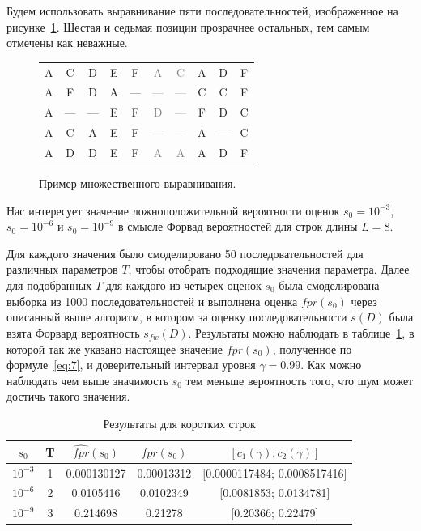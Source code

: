 \documentclass[specialist,
substylefile = spbu_report.rtx,
subf,href,colorlinks=true, 12pt]{disser}
\begin{document}
			Будем использовать выравнивание пяти последовательностей, изображенное на рисунке~\ref{fg:4}. Шестая и седьмая позиции прозрачнее остальных, тем самым отмечены как неважные.		
			\begin{figure}[h]
				\centering
				\begin{tabular}{cccccccccc}
					A&C&D&E&F&\textcolor{gray}{A}&\textcolor{gray}{C}&A&D&F\\
					A&F&D&A&—&\textcolor{gray}{—}&\textcolor{gray}{—}&C&C&F\\
					A&—&—&E&F&\textcolor{gray}{D}&\textcolor{gray}{—}&F&D&C\\
					A&C&A&E&F&\textcolor{gray}{—}&\textcolor{gray}{—}&A&—&C\\
					A&D&D&E&F&\textcolor{gray}{A}&\textcolor{gray}{A}&A&D&F
				\end{tabular}
				\caption{Пример множественного выравнивания.} 
				\label{fg:4}
			\end{figure}					
			
			Нас интересует значение ложноположительной вероятности оценок $s_{0}=10^{-3}$, $s_{0}=10^{-6}$ и $s_{0}=10^{-9}$ в смысле Форвад вероятностей для строк длины $L=8$.
			
			Для каждого значения было смоделировано 50 последовательностей для различных параметров $T$, чтобы отобрать подходящие значения параметра. Далее для подобранных $T$ для каждого из четырех оценок $s_{0}$ была смоделирована выборка из 1000 последовательностей и выполнена оценка $\widehat{fpr}(s_{0})$ через описанный выше алгоритм, в котором за оценку последовательности $s(D)$ была взята Форвард вероятность $s_{fw}(D)$. Результаты можно наблюдать в таблице~\ref{tb:1}, в которой так же указано настоящее значение $fpr(s_0)$, полученное по формуле~\eqref{eq:7}, и доверительный интервал уровня $\gamma = 0.99$. Как можно наблюдать чем выше значимость $s_{0}$ тем меньше вероятность того, что шум может достичь такого значения.
			\begin{table}
				\centering
				\caption{Результаты для коротких строк} 
				\label{tb:1}
				\begin{tabular}{ccccc}
					$s_{0}$&T&$\widehat{fpr}(s_{0})$&$fpr(s_{0})$&$[c_{1}(\gamma);c_{2}(\gamma)]$  \\ \hline
					$10^{-3}$&1&0.000130127&0.00013312&[0.0000117484; 0.0008517416] \\
					$10^{-6}$&2&0.0105416&0.0102349&[0.0081853; 0.0134781] \\
					$10^{-9}$&3&0.214698&0.21278&[0.20366; 0.22479] \\					
				\end{tabular}
			\end{table}						
						
\end{document}
